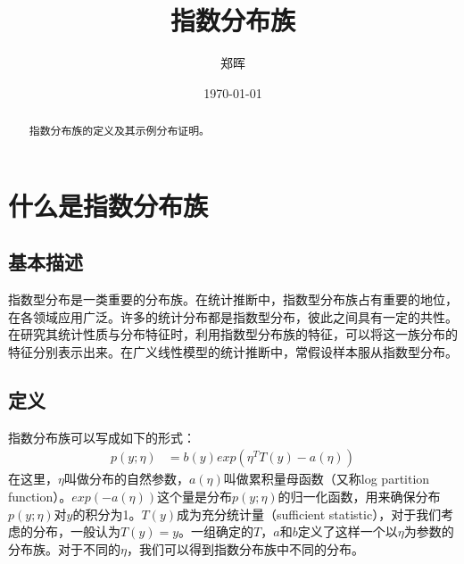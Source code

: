 \documentclass[lang=cn,11pt,a4paper,cite=numbers]{elegantpaper}
\title{指数分布族}
\author{郑晖}
\date{\today}
\begin{document}
\maketitle

\begin{abstract}
  指数分布族的定义及其示例分布证明。
\end{abstract}

\section{什么是指数分布族\cite{exponential-distribution-family}}
\subsection{基本描述}
  指数型分布是一类重要的分布族。在统计推断中，指数型分布族占有重要的地位，在各领域应用广泛。许多的统计分布都是指数型分布，彼此之间具有一定的共性。在研究其统计性质与分布特征时，利用指数型分布族的特征，可以将这一族分布的特征分别表示出来。在广义线性模型的统计推断中，常假设样本服从指数型分布。
\subsection{定义}
  指数分布族可以写成如下的形式：
\begin{equation}
  \begin{aligned}
    p(y;{\eta})&=b(y)exp({\eta}^{T}T(y)-a({\eta}))
  \end{aligned}
\end{equation}
在这里，${\eta}$叫做分布的自然参数，$a({\eta})$叫做累积量母函数（又称log partition function）。$exp(-a({\eta}))$这个量是分布$p(y;{\eta})$的归一化函数，用来确保分布$p(y;{\eta})$对$y$的积分为1。$T(y)$成为充分统计量（sufficient statistic），对于我们考虑的分布，一般认为$T(y)=y$。一组确定的$T$，$a$和$b$定义了这样一个以$\eta$为参数的分布族。对于不同的$\eta$，我们可以得到指数分布族中不同的分布。
\end{document}
